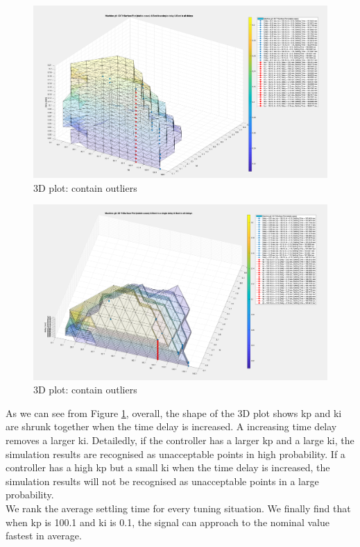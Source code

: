 \documentclass{report}
\begin{document}
\begin{figure}[htbp]
\centering
\includegraphics[width = .819\textwidth]{figure/5_4_1_without_Outlier1.png}
\caption{3D plot: contain outliers}
\label{5_4_1_without_Outlier1}
\end{figure}

\begin{figure}[htbp]
\centering
\includegraphics[width = .819\textwidth]{figure/5_4_1_without_Outlier2.png}
\caption{3D plot: contain outliers}
\label{5_4_1_without_Outlier2}
\end{figure}


As we can see from Figure \textcolor{red}{\ref{5_4_1_without_Outlier1}}, overall, the shape of the 3D plot shows kp and ki are shrunk together when the time delay is increased. A increasing time delay removes a larger ki. Detailedly, if the controller has a larger kp and a large ki, the simulation results are recognised as unacceptable points in high probability. If a controller has a high kp but a small ki when the time delay is increased, the simulation results will not be recognised as unacceptable points in a large probability.\\

We rank the average settling time for every tuning situation. We finally find that when kp is 100.1 and ki is 0.1, the signal can approach to the nominal value fastest in average.\\
\end{document}
